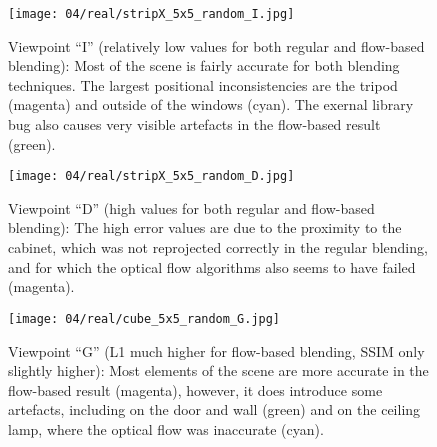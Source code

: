 \begin{figure}
  \centering
  \texttt{[image: 04/real/stripX\_5x5\_random\_I.jpg]}
  \caption[Viewpoint ``I'' in the real scene]{Viewpoint ``I'' (relatively low values for both regular and flow-based blending): Most of the scene is fairly accurate for both blending techniques. The largest positional inconsistencies are the tripod (magenta) and outside of the windows (cyan). The exernal library bug also causes very visible artefacts in the flow-based result (green).}
  \label{fig:real_I}
\end{figure}


\begin{figure}
  \centering
  \texttt{[image: 04/real/stripX\_5x5\_random\_D.jpg]}
  \caption[Viewpoint ``D'' in the real scene]{Viewpoint ``D'' (high values for both regular and flow-based blending): The high error values are due to the proximity to the cabinet, which was not reprojected correctly in the regular blending, and for which the optical flow algorithms also seems to have failed (magenta).}
  \label{fig:real_D}
\end{figure}


\begin{figure}
		\centering
    \texttt{[image: 04/real/cube\_5x5\_random\_G.jpg]}
		\caption[Viewpoint ``G'' in the real scene]{Viewpoint ``G'' (L1 much higher for flow-based blending, SSIM only slightly higher): Most elements of the scene are more accurate in the flow-based result (magenta), however, it does introduce some artefacts, including on the door and wall (green) and on the ceiling lamp, where the optical flow was inaccurate (cyan).}
		\label{fig:real_G}
\end{figure}


